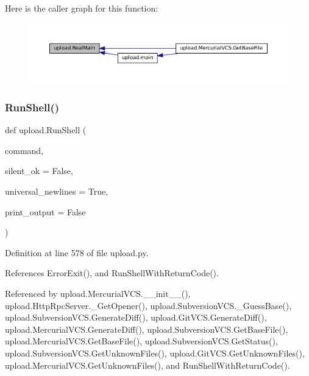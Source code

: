 Here is the caller graph for this function\+:
\nopagebreak
\begin{figure}[H]
\begin{center}
\leavevmode
\includegraphics[width=350pt]{namespaceupload_ad6226af96c9f1905602b8002bd5de952_icgraph}
\end{center}
\end{figure}
\mbox{\label{namespaceupload_adddc423c49132e8879cbb25d6be2cf11}} 
\subsubsection{\texorpdfstring{Run\+Shell()}{RunShell()}}
{\footnotesize\ttfamily def upload.\+Run\+Shell (\begin{DoxyParamCaption}\item[{}]{command,  }\item[{}]{silent\+\_\+ok = {\ttfamily False},  }\item[{}]{universal\+\_\+newlines = {\ttfamily True},  }\item[{}]{print\+\_\+output = {\ttfamily False} }\end{DoxyParamCaption})}



Definition at line 578 of file upload.\+py.



References Error\+Exit(), and Run\+Shell\+With\+Return\+Code().



Referenced by upload.\+Mercurial\+V\+C\+S.\+\_\+\+\_\+init\+\_\+\+\_\+(), upload.\+Http\+Rpc\+Server.\+\_\+\+Get\+Opener(), upload.\+Subversion\+V\+C\+S.\+\_\+\+Guess\+Base(), upload.\+Subversion\+V\+C\+S.\+Generate\+Diff(), upload.\+Git\+V\+C\+S.\+Generate\+Diff(), upload.\+Mercurial\+V\+C\+S.\+Generate\+Diff(), upload.\+Subversion\+V\+C\+S.\+Get\+Base\+File(), upload.\+Mercurial\+V\+C\+S.\+Get\+Base\+File(), upload.\+Subversion\+V\+C\+S.\+Get\+Status(), upload.\+Subversion\+V\+C\+S.\+Get\+Unknown\+Files(), upload.\+Git\+V\+C\+S.\+Get\+Unknown\+Files(), upload.\+Mercurial\+V\+C\+S.\+Get\+Unknown\+Files(), and Run\+Shell\+With\+Return\+Code().


